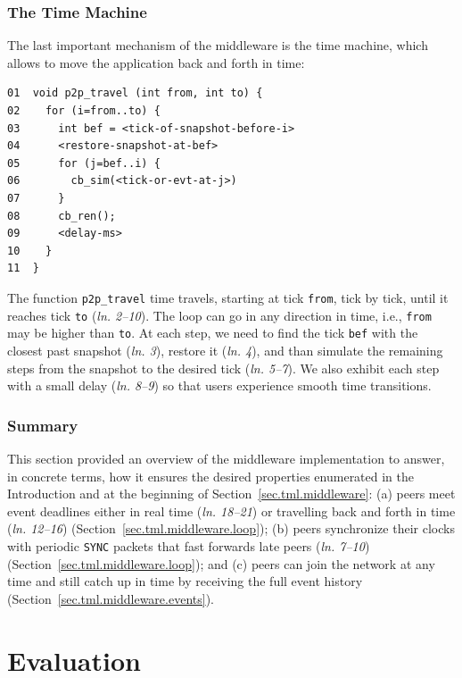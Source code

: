 \documentclass[10pt,journal,compsoc]{IEEEtran}
\newcommand{\code}[1]  {\texttt{\footnotesize{#1}}}
\newcommand{\lin}[1]{(\emph{ln. #1}\xspace)}
\begin{document}
\subsubsection{The Time Machine}
\label{sec.tml.middleware.travel}

The last important mechanism of the middleware is the time machine, which
allows to move the application back and forth in time:

{\footnotesize
\begin{verbatim}
01  void p2p_travel (int from, int to) {
02    for (i=from..to) {
03      int bef = <tick-of-snapshot-before-i>
04      <restore-snapshot-at-bef>
05      for (j=bef..i) {
06        cb_sim(<tick-or-evt-at-j>)
07      }
08      cb_ren();
09      <delay-ms>
10    }
11  }
\end{verbatim}
}

The function \code{p2p\_travel} time travels, starting at tick \code{from},
tick by tick, until it reaches tick \code{to} \lin{2--10}.
The loop can go in any direction in time, i.e., \code{from} may be higher than
\code{to}.
At each step, we need to find the tick \code{bef} with the closest past
snapshot \lin{3}, restore it \lin{4}, and than simulate the remaining steps
from the snapshot to the desired tick \lin{5--7}.
We also exhibit each step with a small delay \lin{8--9} so that users
experience smooth time transitions.

\subsubsection{Summary}
\label{sec.tml.middleware.summary}

This section provided an overview of the middleware implementation to answer,
in concrete terms, how it ensures the desired properties enumerated in the
Introduction and at the beginning of Section~\ref{sec.tml.middleware}:
    (a) peers meet event deadlines either in real time \lin{18--21} or
        travelling back and forth in time \lin{12--16}
        (Section~\ref{sec.tml.middleware.loop});
    (b) peers synchronize their clocks with periodic \code{SYNC} packets that
        fast forwards late peers \lin{7--10}
        (Section~\ref{sec.tml.middleware.loop}); and
    (c) peers can join the network at any time and still catch up in time by
        receiving the full event history
        (Section~\ref{sec.tml.middleware.events}).

\section{Evaluation}
\label{sec.eval}
\end{document}
